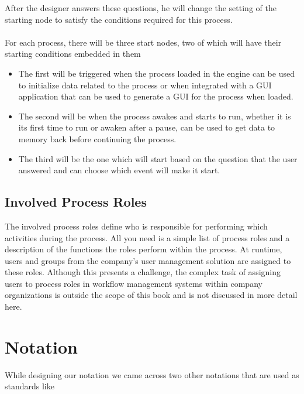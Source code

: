 After the designer answers these questions, he will change the setting of the starting node to satisfy
the conditions required for this process.\\\\
For each process, there will be three start nodes, two of which will have their starting conditions
embedded in them
\begin{itemize}
    \item The first will be triggered when the process loaded in the engine can be used to
    initialize data related to the process or when integrated with a GUI application that
    can be used to generate a GUI for the process when loaded.
    \item The second will be when the process awakes and starts to run, whether it is its first
    time to run or awaken after a pause, can be used to get data to memory back before
    continuing the process.
    \item The third will be the one which will start based on the question that the user answered
    and can choose which event will make it start.
   \end{itemize}

\subsection{Involved Process Roles}
The involved process roles define who is responsible for performing which
activities during the process. All you need is a simple list of process roles and a
description of the functions the roles perform within the process. At runtime, users
and groups from the company’s user management solution are assigned to these
roles. Although this presents a challenge, the complex task of assigning users to
process roles in workflow management systems within company organizations is
outside the scope of this book and is not discussed in more detail here.

\section{Notation}
While designing our notation we came across two other notations that are used as standards like\\\\

